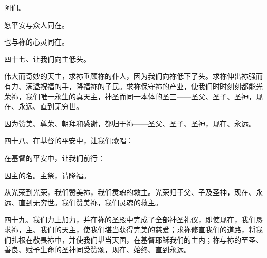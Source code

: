 \par

阿们。\par

\par

愿平安与众人同在。\par

\par

也与祢的心灵同在。\par

\par

四十七、让我们向主低头。\par

\par

伟大而奇妙的天主，求祢垂顾祢的仆人，因为我们向祢低下了头。求祢伸出祢强而有力、满溢祝福的手，降福祢的子民。求祢保守祢的产业，使我们时时刻刻都能光荣祢，我们唯一永生的真天主，神圣而同一本体的圣三——圣父、圣子、圣神，现在、永远、直到无穷世。\par

\par

因为赞美、尊荣、朝拜和感谢，都归于祢——圣父、圣子、圣神，现在、永远。\par

\par

四十八、在基督的平安中，让我们歌唱：\par

\par

在基督的平安中，让我们前行：\par

\par

因主的名。主祭，请降福。\par

\par

从光荣到光荣，我们赞美祢，我们灵魂的救主。光荣归于父、子及圣神，现在、永远、直到无穷世。我们赞美祢，我们灵魂的救主。\par

\par

四十九、我们力上加力，并在祢的圣殿中完成了全部神圣礼仪，即使现在，我们恳求祢，主、我们的天主，使我们堪当获得完美的慈爱；求祢修直我们的道路，将我们扎根在敬畏祢中，并使我们堪当天国，在基督耶稣我们的主内；祢与祢的至圣、善良、赋予生命的圣神同受赞颂，现在、始终、直到永远。\par

